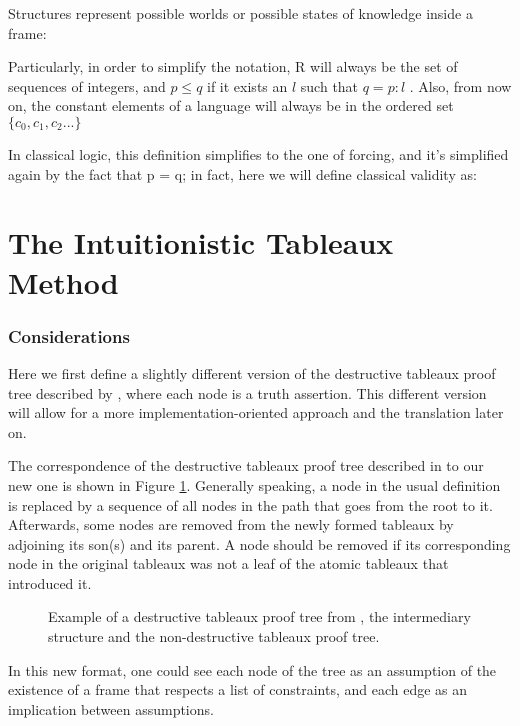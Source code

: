 \documentclass[runningheads]{llncs}
\begin{document}
\structureDefinition
Structures represent possible worlds or possible states of knowledge inside a frame:
\kripkeFrameDefinition

Particularly, in order to simplify the notation, R will always be the set of sequences of integers, and $p \leq q$ if it exists an $l$ such that $q =  p:l$  . 
 Also, from now on, the constant elements of a language will always be in the ordered set $\{c_0, c_1, c_2 ...\}$
 
 \figureRandFrame

\forcingDefinition

\intuitionisticValidityDefinition

In classical logic, this definition simplifies to the one of forcing, and it's simplified again by the fact that p = q; in fact, here we will define classical validity as: \cite{book1}

\classicalValidityDefinition

\section{The Intuitionistic Tableaux Method}

\subsubsection{Considerations}


    Here we first define a slightly different version of the destructive tableaux proof tree described by \cite{book1}, where each node is a truth assertion. This different version  will allow for a more implementation-oriented approach and the translation later on.

    The correspondence of the destructive tableaux proof tree described in \cite{book1} to our new one is shown in Figure \ref{fig:non_destructive_to_destructive_tableaux}. Generally speaking, a node in the usual definition is replaced by a sequence of all nodes in the path that goes from the root to it. Afterwards, some nodes are removed from the newly formed tableaux by adjoining its son(s) and its parent. A node should be removed if its corresponding node in the original tableaux was not a leaf of the atomic tableaux \cite{book1} that introduced it.

    \begin{figure}
\tableauxCumulativeAndNonCumulativeExampleFigure
\caption{Example of a destructive tableaux proof tree from \cite{book1}, the intermediary structure and the non-destructive tableaux proof tree.}
\label{fig:non_destructive_to_destructive_tableaux}
\end{figure}
    In this new format, one could see each node of the tree as an assumption of the existence of 
    a frame that respects a list of constraints, and each edge as an implication between assumptions.
\end{document}
